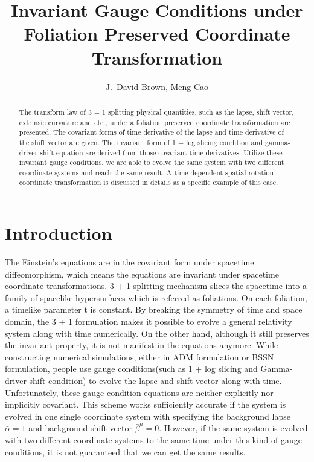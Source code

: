 \documentclass[letterpaper,nofootinbib,prd,amsmath,onecolumn]{revtex4-1}
\begin{document}

\title{Invariant Gauge Conditions under Foliation Preserved Coordinate Transformation}
\author{J.~David Brown, Meng Cao}

\begin{abstract}
The transform law of 3 + 1 splitting physical quantities, such as the lapse, shift vector, extrinsic curvature and etc., under a foliation preserved coordinate transformation are presented. The covariant forms of time derivative of the lapse and time derivative of the shift vector are given. The invariant form of 1 + log slicing condition and gamma-driver shift equation are derived from those covariant time derivatives. Utilize these invariant gauge conditions, we are able to evolve the same system with two different coordinate systems and reach the same result. A time dependent spatial rotation coordinate transformation is discussed in details as a specific example of this case.  
\end{abstract}
\maketitle

\section{Introduction}
The Einstein's equations are in the covariant form under spacetime diffeomorphism, which means the equations are invariant under spacetime coordinate transformations. 3 + 1 splitting mechanism slices the spacetime into a family of spacelike hypersurfaces which is referred as foliations. On each foliation, a timelike parameter t is constant. By breaking the symmetry of time and space domain, the 3 + 1 formulation makes it possible to evolve a general relativity system along with time numerically. On the other hand, although it still preserves the invariant property, it is not manifest in the equations anymore. While constructing numerical simulations, either in ADM formulation or BSSN formulation, people use gauge conditions(such as 1 + log slicing and Gamma-driver shift condition) to evolve the lapse and shift vector along with time. Unfortunately, these gauge condition equations are neither explicitly nor implicitly covariant. This scheme works sufficiently accurate if the system is evolved in one single coordinate system with specifying the background lapse ${\bar \alpha} = 1$ and background shift vector ${\bar \beta}^{a} = 0$. However, if the same system is evolved with two different coordinate systems to the same time under this kind of gauge conditions, it is not guaranteed that we can get the same results. 
\end{document}
